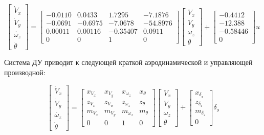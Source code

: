 \begin{equation}
    \label{eq:Линеаризованная моель СПС}
\begin{bmatrix}
        \dot{V}_x\\ 
        \dot{V}_y\\ 
        \dot{\omega_z}\\ 
        \dot{\theta}
    \end{bmatrix} =
    \begin{bmatrix}
        -0.0110 & 0.0433 & 1.7295 & -7.1876\\ 
        -0.0691 & -0.6975 & -7.0678 & -54.8976\\ 
        0.00011 & 0.00116 & -0.35407 & 0.0911\\ 
        0 & 0 & 1 & 0
    \end{bmatrix} \begin{bmatrix}
        V_x\\ 
        V_y\\ 
        \omega_z \\ 
        \theta
    \end{bmatrix} 
        +\begin{bmatrix}
        -0.4412\\ 
        -12.388\\ 
        -0.58446 \\ 
        0
    \end{bmatrix}  u
\end{equation}

Система ДУ приводит к следующей краткой аэродинамической и управляющей производной:

\begin{equation}
    \label{eq:Линеаризованная моель СПС}
\begin{bmatrix}
        \dot{V}_x\\ 
        \dot{V}_y\\ 
        \dot{\omega_z}\\ 
        \dot{\theta}
    \end{bmatrix} =
    \begin{bmatrix}
        x_{V_x}& x_{V_y}&x_{\omega_z} &x_{\theta} \\ 
        z_{V_x}&z_{V_w} &z_{\omega_z} &z_\theta \\ 
        m_{V_x}&m_{V_y} &m_{\omega_z} &m_\theta \\ 
        0& 0& 1&0 
    \end{bmatrix} \begin{bmatrix}
        V_x\\ 
        V_y\\ 
        \omega_z \\ 
        \theta
    \end{bmatrix} 
        +\begin{bmatrix}
        x_{\delta_\text{э}}\\ 
        z_{\delta_\text{э}}\\ 
        m_{\delta_\text{э}}\\ 
        0
    \end{bmatrix} \delta_\text{э} 
\end{equation}

